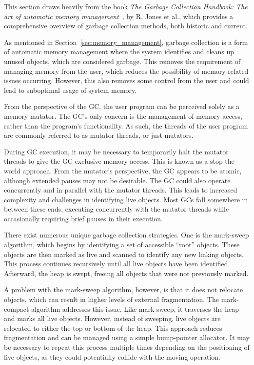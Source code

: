 This section draws heavily from the book \textit{The Garbage Collection Handbook: The art of automatic memory management}~\cite{gchandbook}, by R. Jones et al., which provides a comprehensive overview of garbage collection methods, both historic and current.

As mentioned in Section~\ref{sec:memory_management}, garbage collection is a form of automatic memory management where the system identifies and cleans up unused objects, which are considered garbage. This removes the requirement of managing memory from the user, which reduces the possibility of memory-related issues occurring. However, this also removes some control from the user and could lead to suboptimal usage of system memory.

From the perspective of the GC, the user program can be perceived solely as a memory mutator. The GC's only concern is the management of memory access, rather than the program's functionality. As such, the threads of the user program are commonly referred to as mutator threads, or just mutators.

During GC execution, it may be necessary to temporarily halt the mutator threads to give the GC exclusive memory access. This is known as a stop-the-world approach. From the mutator's perspective, the GC appears to be atomic, although extended pauses may not be desirable. The GC could also operate concurrently and in parallel with the mutator threads. This leads to increased complexity and challenges in identifying live objects. Most GCs fall somewhere in between these ends, executing concurrently with the mutator threads while occasionally requiring brief pauses in their execution.

There exist numerous unique garbage collection strategies. One is the mark-sweep algorithm, which begins by identifying a set of accessible ``root'' objects. These objects are then marked as live and scanned to identify any new linking objects. This process continues recursively until all live objects have been identified. Afterward, the heap is swept, freeing all objects that were not previously marked.

A problem with the mark-sweep algorithm, however, is that it does not relocate objects, which can result in higher levels of external fragmentation. The mark-compact algorithm addresses this issue. Like mark-sweep, it traverses the heap and marks all live objects. However, instead of sweeping, live objects are relocated to either the top or bottom of the heap. This approach reduces fragmentation and can be managed using a simple bump-pointer allocator. It may be necessary to repeat this process multiple times depending on the positioning of live objects, as they could potentially collide with the moving operation.

